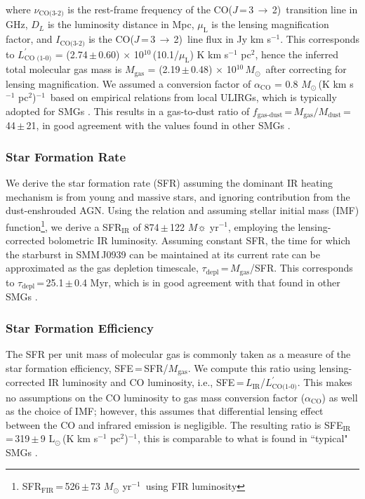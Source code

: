 \documentclass[twocolumn,apj,numberedappendix]{emulateapj}
\newcommand{\Msun}{\mbox{$M_{\odot}$}}
\newcommand{\Lsun}{\mbox{L$_{\odot}$}}
\newcommand{\CO}{\mbox{CO($J$\,=\,3\,$\rightarrow$\,2) }}
\newcommand{\Lp}{\mbox{$L^{\prime}_\textrm{CO(1-0)}$}}
\newcommand{\LpU}{\mbox{K\,\,km\,\,s$^{-1}$\,\,pc$^2$}}
\newcommand{\eg}{{\sl e.g.,~}}
\newcommand{\pmOne}{\mbox{$^{-1}$}}
\begin{document}
where $\nu_\textrm{CO(3-2)}$ is the rest-frame frequency of the \CO transition line in GHz, $D_L$ is the luminosity distance in Mpc, $\mu_\textrm{L}$ is the lensing magnification factor, and $I_\textrm{CO(3-2)}$ is the \CO line flux in Jy\,\,km\,\,s\pmOne. This corresponds to $L^{\prime}_\textrm{CO (1-0)}$ = (2.74\,$\pm$\,0.60) $\times$\,\,10$^{10}$\,(10.1/$\mu_\textrm{L}$)\,\,\LpU, hence
the inferred total molecular gas mass is $M_\textrm{gas}$ = (2.19\,$\pm$\,0.48) $\times$\,\,10$^{10}$\,\Msun\, after correcting for lensing magnification. We assumed a conversion factor of $\alpha_\textrm{CO}$ = 0.8\,\,\Msun\,(\LpU)\pmOne\ based on empirical relations from local ULIRGs, which is typically
adopted for SMGs \citep[\eg][]{Tacconi06a,Tacconi08a,Bothwell13a}. 
This results in a gas-to-dust
ratio of $f_\textrm{gas-dust}$\,=\,$M_\textrm{gas}/M_\textrm{dust}$\,=\,44\,$\pm$\,21, in good agreement with the 
values found in other SMGs \citep{Coppin08a,Micha10a,Riechers11c}.

\subsubsection{Star Formation Rate}
We derive the star formation rate (SFR) assuming the dominant IR heating mechanism is from young and massive stars, and ignoring contribution from the 
dust-enshrouded AGN. 
Using the \citet{Kennicutt98a} relation and assuming \citet{Chabrier03a}
stellar initial mass (IMF) function\footnote{SFR$_\textrm{FIR}$\,=\,526\,$\pm$\,73 $M_
\odot$ yr\pmOne\ using FIR luminosity},
we derive a SFR$_\textrm{IR}$ of 874\,$\pm$\,122\,\,$M\sun$\,\,yr\pmOne, employing the lensing-corrected bolometric IR luminosity.
Assuming constant SFR, the time for which the starburst in SMM\,J0939 can be maintained at its
current rate can be approximated as the gas depletion timescale, $\tau_\textrm{depl}$\,=\,$M_\textrm{gas}$/SFR. 
This corresponds to $\tau_\textrm{depl}$\,=\,25.1\,$\pm$\,0.4 Myr, which is in good agreement with that found in other SMGs \citep[\eg][]{Greve05a}. 

\subsubsection{Star Formation Efficiency}
The SFR per unit mass of molecular gas is commonly taken as a
measure of the star formation efficiency, SFE\,=\,SFR/$M_\textrm{gas}$. We compute this ratio using lensing-corrected IR 
luminosity and CO luminosity, i.e., SFE\,=\,$L_\textrm{IR}$/\Lp. This makes no assumptions on the CO luminosity to gas mass conversion factor ($\alpha_\textrm{CO}$) as well as the 
choice of IMF; however, this assumes that differential lensing effect between the CO and infrared emission is negligible. 
The resulting ratio is SFE$_\textrm{IR}$\,=\,319\,$\pm$\,9\,\,\Lsun\,(\LpU)$^{-1}$, this is comparable
to what is found in ``typical" SMGs \citep{Greve05a,Tacconi06a,Riechers11c}.
\end{document}
